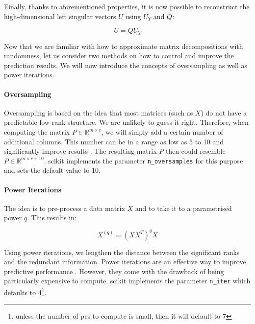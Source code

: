 Finally, thanks to aforementioned properties, it is now possible to reconstruct the high-dimensional left singular vectors $U$ using $U_Y$ and $Q$:

\vspace{-4mm}
\begin{equation}
	\label{formula:rSVDstepFIVE}
	U = Q U_Y
\end{equation}
\smallskip


Now that we are familiar with how to approximate matrix decompositions with randomness, let us consider two methods on how to control and improve the prediction results.
We will now introduce the concepts of oversampling as well as power iterations.

\paragraph{Oversampling}

Oversampling is based on the idea that most matrices (such as $X$) do not have a predictable low-rank structure.
We are unlikely to guess it right.
Therefore, when computing the matrix $P \in \mathbb{R}^{m \times r}$, we will simply add a certain number of additional columns.
This number can be in a range as low as 5 to 10 and significantly improve results \cite{martinsson2016randomized}.
The resulting matrix $P$ then could resemble $P \in \mathbb{R}^{m \times r+10}$.
\gls{scikit} implements the parameter \texttt{n\_oversamples} for this purpose and sets the default value to 10.



\paragraph{Power Iterations}

The idea is to pre-process a data matrix $X$ and to take it to a parametrised power $q$.
This results in:

\vspace{-4mm}
\begin{equation}
	\label{formula:powerIterations}
	X^{(q)} = (XX^T)^q X
\end{equation}

Using power iterations, we lengthen the distance between the significant ranks and the redundant information.
Power iterations are an effective way to improve predictive performance \cite{halko2011finding}.
However, they come with the drawback of being particularly expensive to compute.
\gls{scikit} implements the parameter \texttt{n\_iter} which defaults to 4\footnote{%
unless the number of \glspl{pc} to compute is small, then it will default to 7%
}.
\bigskip
\bigskip


